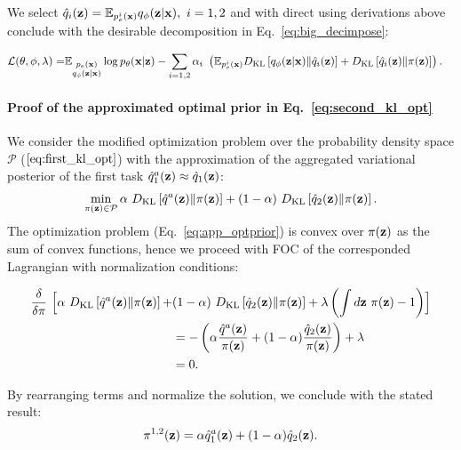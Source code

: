 We select $\hat{q}_{i}({\mathbf{z}}) = \mathbb{E}_{p^{i}_{e}({\mathbf{x}})}q_{\phi}({\mathbf{z}}|{\mathbf{x}}),~i=1,2$ and with direct using derivations above conclude with the desirable decomposition in Eq.~\ref{eq:big_decimpose}:
\begin{fullwidth}
\begin{equation}
    \begin{aligned}
     \mathcal{L}(\theta, \phi, \lambda) = & \mathbb{E}_{\substack{p_{e}({\mathbf{x}})\\q_{\phi}({\mathbf{z}}|{\mathbf{x}})}}\log p_{\theta}({\mathbf{x}}|{\mathbf{z}})  - \sum\limits_{i=1,2}\alpha_i~\left( \mathbb{E}_{p^i_{e}({\mathbf{x}})}D_{\mathrm{KL}}\left[q_{\phi}({\mathbf{z}}|{\mathbf{x}})\|\hat{q}_{i}({\mathbf{z}})\right]+ D_{\mathrm{KL}}\left[\hat{q}_{i}({\mathbf{z}})\|\pi({\mathbf{z}})\right]\right).
    \end{aligned}
\end{equation}
\end{fullwidth}
\paragraph{Proof of the approximated optimal prior in Eq.~\ref{eq:second_kl_opt}}
We consider the modified optimization problem over the probability density space $\mathcal{P}$ ($\ref{eq:first_kl_opt}$) with the approximation of the aggregated variational posterior of the first task
$\hat{q}_{1}^{a}({\mathbf{z}})\approx\hat{q}_{1}({\mathbf{z}})$:
\begin{equation}
\label{eq:app_optprior}
    \begin{aligned}
    \min\limits_{\pi(\rvz)\in\mathcal{P}}\alpha~\KL{\hat{q}^{a}(\rvz)}{\pi(\rvz)}  + (1-\alpha)~\KL{\hat{q}_{2}(\rvz)}{\pi(\rvz)}.
    \end{aligned}
\end{equation}
The optimization problem (Eq.~\ref{eq:app_optprior}) is convex over $\pi({\mathbf{z}})$ as the sum of convex functions, hence we proceed with FOC of the corresponded Lagrangian with normalization conditions:
\begin{fullwidth}
\begin{equation}
    \begin{aligned}
     \frac{\delta}{\delta\pi} ~\Bigl[\alpha~D_{\mathrm{KL}}\left[\hat{q}^{a}({\mathbf{z}})\|\pi({\mathbf{z}})\right] + &(1-\alpha)~D_{\mathrm{KL}}\left[\hat{q}_{2}({\mathbf{z}})\|\pi({\mathbf{z}})\right]  + \lambda \left(\int d{\mathbf{z}}~\pi({\mathbf{z}}) - 1 \right)\Bigr]  \\
     &= - \left(\alpha \frac{\hat{q}^{a}({\mathbf{z}})}{\pi({\mathbf{z}})} + (1-\alpha)\frac{\hat{q}_{2}({\mathbf{z}})}{\pi({\mathbf{z}})}\right) + \lambda \\
     &= 0.
    \end{aligned}
\end{equation}
\end{fullwidth}
By rearranging terms and normalize the solution, we conclude with the stated result:
\begin{equation}
    \begin{aligned}
    \pi^{1,2}({\mathbf{z}}) = \alpha \hat{q}_{1}^{a}({\mathbf{z}}) + (1-\alpha) \hat{q}_{2}({\mathbf{z}}).
    \end{aligned}
\end{equation}
